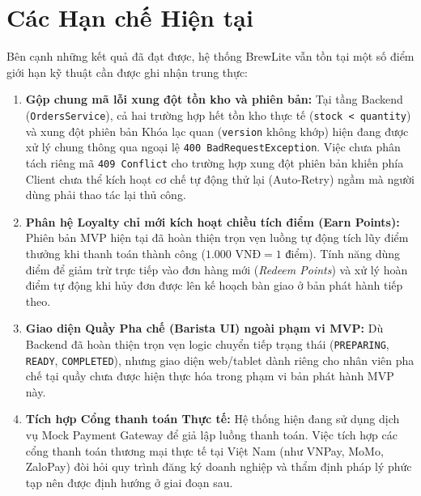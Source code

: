 \documentclass[12pt,a4paper,oneside]{report}
\begin{document}
\section{Các Hạn chế Hiện tại}
Bên cạnh những kết quả đã đạt được, hệ thống BrewLite vẫn tồn tại một số điểm giới hạn kỹ thuật cần được ghi nhận trung thực:
\begin{enumerate}
    \item \textbf{Gộp chung mã lỗi xung đột tồn kho và phiên bản:} Tại tầng Backend (\texttt{OrdersService}), cả hai trường hợp hết tồn kho thực tế (\texttt{stock < quantity}) và xung đột phiên bản Khóa lạc quan (\texttt{version} không khớp) hiện đang được xử lý chung thông qua ngoại lệ \texttt{400 BadRequestException}. Việc chưa phân tách riêng mã \texttt{409 Conflict} cho trường hợp xung đột phiên bản khiến phía Client chưa thể kích hoạt cơ chế tự động thử lại (Auto-Retry) ngầm mà người dùng phải thao tác lại thủ công.
    \item \textbf{Phân hệ Loyalty chỉ mới kích hoạt chiều tích điểm (Earn Points):} Phiên bản MVP hiện tại đã hoàn thiện trọn vẹn luồng tự động tích lũy điểm thưởng khi thanh toán thành công (\(1.000 \text{ VNĐ} = 1 \text{ điểm}\)). Tính năng dùng điểm để giảm trừ trực tiếp vào đơn hàng mới (\textit{Redeem Points}) và xử lý hoàn điểm tự động khi hủy đơn được lên kế hoạch bàn giao ở bản phát hành tiếp theo.
    \item \textbf{Giao diện Quầy Pha chế (Barista UI) ngoài phạm vi MVP:} Dù Backend đã hoàn thiện trọn vẹn logic chuyển tiếp trạng thái (\texttt{PREPARING}, \texttt{READY}, \texttt{COMPLETED}), nhưng giao diện web/tablet dành riêng cho nhân viên pha chế tại quầy chưa được hiện thực hóa trong phạm vi bản phát hành MVP này.
    \item \textbf{Tích hợp Cổng thanh toán Thực tế:} Hệ thống hiện đang sử dụng dịch vụ Mock Payment Gateway để giả lập luồng thanh toán. Việc tích hợp các cổng thanh toán thương mại thực tế tại Việt Nam (như VNPay, MoMo, ZaloPay) đòi hỏi quy trình đăng ký doanh nghiệp và thẩm định pháp lý phức tạp nên được định hướng ở giai đoạn sau.
\end{enumerate}
\end{document}
